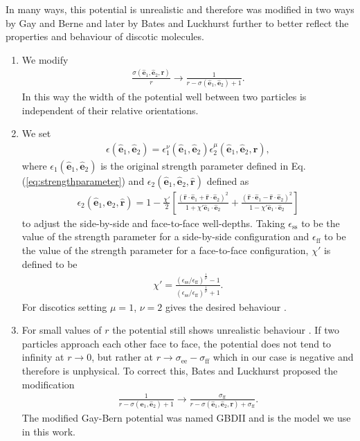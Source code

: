 In many ways, this potential is unrealistic \cite{gay1981modification} and therefore was modified in two ways by Gay and Berne  and later by Bates and Luckhurst \cite{bates1996computer} further to better reflect the properties and behaviour of discotic molecules. 
\begin{enumerate}
    \item We modify \begin{align}
       \frac{\sigma(\mathbf{\hat{e}}_1,\mathbf{\hat{e}}_2,\mathbf{r})}{r} \to \frac{1}{r-\sigma(\mathbf{\hat{e}}_1,\mathbf{\hat{e}}_2)+1}.
    \end{align}
    In this way the width of the potential well between two particles is independent of their relative orientations.
    \item We set 
    \begin{align}
        \epsilon(\mathbf{\hat{e}}_1,\mathbf{\hat{e}}_2) = \epsilon_1^\nu(\mathbf{\hat{e}}_1,\mathbf{\hat{e}}_2) \epsilon_2^\mu(\mathbf{\hat{e}}_1,\mathbf{\hat{e}}_2,\mathbf{\hat{r}}),
    \end{align}
    where $\epsilon_1(\mathbf{\hat{e}}_1,\mathbf{\hat{e}}_2)$ is the original strength parameter defined in Eq. (\ref{eq:strengthparameter}) and $\epsilon_2(\mathbf{\hat{e}}_1,\mathbf{\hat{e}}_2,\mathbf{\hat{r}})$ defined as
    \begin{align}
        \epsilon_2(\mathbf{\hat{e}}_1,\mathbf{\hat{e}}_2,\mathbf{\hat{r}})= 1-\frac{\chi'}{2}\left\lbrack\frac{(\mathbf{\hat{r}}\cdot\mathbf{\hat{e}}_1+\mathbf{\hat{r}}\cdot\mathbf{\hat{e}}_2)^2}{1+\chi'\mathbf{\hat{e}}_1\cdot\mathbf{\hat{e}}_2}+\frac{(\mathbf{\hat{r}}\cdot\mathbf{\hat{e}}_1-\mathbf{\hat{r}}\cdot\mathbf{\hat{e}}_2)^2}{1-\chi'\mathbf{\hat{e}}_1\cdot\mathbf{\hat{e}}_2}\right\rbrack
    \end{align}
    to adjust the side-by-side and face-to-face well-depths. Taking $\epsilon_{\text{ss}}$ to be the value of the strength parameter for a side-by-side configuration and $\epsilon_{\text{ff}}$ to be the value of the strength parameter for a face-to-face configuration, $\chi'$ is defined to be
    \begin{align}
        \chi'=  \frac{(\epsilon_{\text{ss}}/\epsilon_{\text{ff}})^\frac{1}{\mu}-1}{(\epsilon_{\text{ss}}/\epsilon_{\text{ff}})^\frac{1}{\mu}+1}.    
    \end{align}
    For discotics setting $\mu=1$, $\nu=2$ gives the desired behaviour \cite{gay1981modification}.
    \item For small values of $r$ the potential still shows unrealistic behaviour \cite{bates1996computer}. If two particles approach each other face to face, the potential does not tend to infinity at $r \to 0$, but rather at $r \to \sigma_{\text{ee}}-\sigma_{\text{ff}}$ which in our case is negative and therefore is unphysical. To correct this, Bates and Luckhurst proposed the modification
    \begin{align}
        \frac{1}{r-\sigma(\mathbf{\hat{e}}_1,\mathbf{\hat{e}}_2)+1} \to \frac{\sigma_{\text{ff}}}{r-\sigma(\mathbf{\hat{e}}_1,\mathbf{\hat{e}}_2,\mathbf{r})+\sigma_\text{ff}}.
    \end{align}
    The modified Gay-Bern potential was named {GBDII} and is the model we use in this work. 
\end{enumerate}
